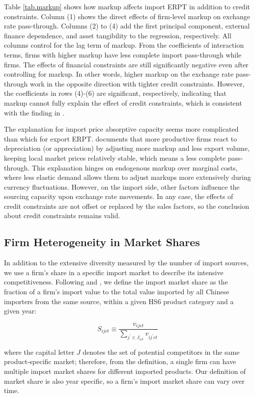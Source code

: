 \documentclass[12pt]{article}
\begin{document}
Table \ref{tab.markup} shows how markup affects import ERPT in addition to credit constraints. Column (1) shows the direct effects of firm-level markup on exchange rate pass-through. Columns (2) to (4) add the first principal component, external finance dependence, and asset tangibility to the regression, respectively. All columns control for the lag term of markup. From the coefficients of interaction terms, firms with higher markup have less complete import pass-through while firms. The effects of financial constraints are still significantly negative even after controlling for markup. In other words, higher markup on the exchange rate pass-through work in the opposite direction with tighter credit constraints. However, the coefficients in rows (4)-(6) are significant, respectively, indicating that markup cannot fully explain the effect of credit constraints, which is consistent with the finding in \cite{xu-guo2021}.

The explanation for import price absorptive capacity seems more complicated than which for export ERPT. \cite{bmm2012} documents that more productive firms react to depreciation (or appreciation) by adjusting more markup and less export volume, keeping local market prices relatively stable, which means a less complete pass-through. This explanation hinges on endogenous markup over marginal costs, where less elastic demand allows them to adjust markups more extensively during currency fluctuations. However, on the import side, other factors influence the sourcing capacity upon exchange rate movements. In any case, the effects of credit constraints are not offset or replaced by the sales factors, so the conclusion about credit constraints remains valid.

\subsection{Firm Heterogeneity in Market Shares}
In addition to the extensive diversity measured by the number of import sources, we use a firm's share in a specific import market to describe its intensive competitiveness. Following \cite{aik2014} and \cite{devereux2017}, we define the import market share as the fraction of a firm's import value to the total value imported by all Chinese importers from the same source, within a given HS6 product category and a given year: 

$$
S_{ijct} \equiv \frac{v_{ijct}}{\sum_{j^{\prime} \in J_{ict}} v_{ij^{\prime}ct}}
$$

where the capital letter $J$ denotes the set of potential competitors in the same product-specific market; therefore, from the definition, a single firm can have multiple import market shares for different imported products. Our definition of market share is also year specific, so a firm’s import market share can vary over time. 
\end{document}
